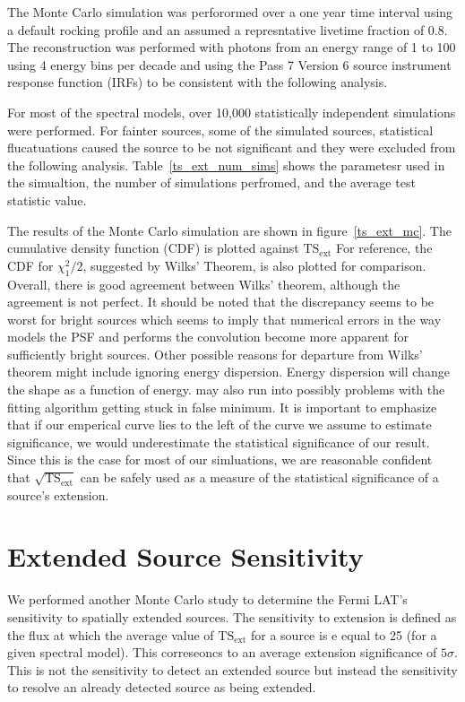 \documentclass[12pt,preprint]{aastex}
\newcommand{\gev}{\text{GeV}\xspace}
\newcommand{\tsext}{{\ensuremath{\text{TS}_\text{ext}}}\xspace}
\newcommand{\pointlike}{\text{\em pointlike}\xspace}
\begin{document}
The Monte Carlo simulation was perforormed over a one year time interval using
a default rocking profile and an assumed a represntative
livetime fraction of 0.8.
The reconstruction was performed with photons from an energy range of
1 \gev to 100 \gev using 4 energy bins per decade and using the Pass 7 Version 6
source instrument response function (IRFs) to be consistent with the following analysis.

For most of the spectral models, over 10,000 statistically independent simulations were performed.
For fainter sources, some of the simulated sources, statistical flucatuations
caused the source to be not significant and they were excluded from the following analysis.
Table~\ref{ts_ext_num_sims} shows the parametesr used in the simualtion,
the number of simulations perfromed, and the average test statistic value.

The results of the Monte Carlo simulation are shown in
figure~\ref{ts_ext_mc}.  The cumulative density function (CDF) is plotted
against $\tsext$ For reference, the CDF for $\chi^2_1/2$,
suggested by Wilks' Theorem, is also plotted for comparison. Overall,
there is good agreement between Wilks' theorem, although the agreement is
not perfect.  It should be noted that the discrepancy seems to be worst
for bright sources which seems to imply that numerical errors in the
way \pointlike models the PSF and performs the convolution become more
apparent for sufficiently bright sources.  Other possible reasons for
departure from Wilks' theorem might include \pointlike ignoring energy
dispersion. Energy dispersion will change the shape as a function of
energy. \pointlike may also run into possibly problems with the fitting
algorithm getting stuck in false minimum. It is important to emphasize
that if
our emperical curve lies to the left of the curve we assume to estimate
significance, we would underestimate the statistical significance of
our result. Since this is the case for most of our simluations, we are
reasonable confident that $\sqrt{\tsext}$ can be safely
used as a measure of the statistical significance of a source's extension.

\section{Extended Source Sensitivity}\label{extension_sensitivity}

We performed another Monte Carlo study to determine the Fermi LAT's
sensitivity to spatially extended sources. The sensitivity to extension
is defined as the flux at which 
the average value of $\tsext$ for a source is 
e equal to 25 (for a given spectral model). This correseoncs
to an average extension significance of $5\sigma$.  This is not the
sensitivity to detect an extended source but instead the sensitivity to
resolve an already detected source as being extended.  
\end{document}
